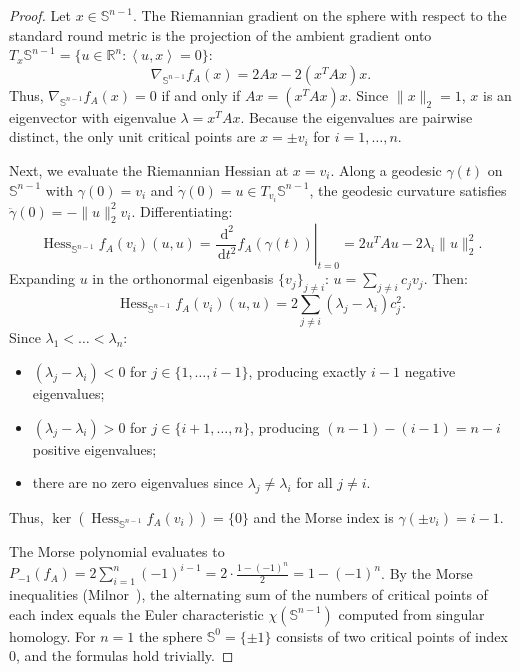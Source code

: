 \documentclass[11pt,a4paper,reqno]{amsart}
\theoremstyle{definition}
\numberwithin{equation}{section}
\newcommand{\R}{\mathbb{R}}
\newcommand{\Sph}{\mathbb{S}}
\newcommand{\inner}[2]{\left\langle #1, #2 \right\rangle}
\newcommand{\dif}{\,\mathrm{d}}
\begin{document}
\begin{proof}
Let $x \in \Sph^{n-1}$. The Riemannian gradient on the sphere with respect to the standard round metric is the projection of the ambient gradient onto $T_x \Sph^{n-1} = \{u \in \R^n \colon \inner{u}{x} = 0\}$:
\begin{equation}
    \nabla_{\Sph^{n-1}} f_A(x) = 2 A x - 2(x^T A x) x.
\end{equation}
Thus, $\nabla_{\Sph^{n-1}} f_A(x) = 0$ if and only if $Ax = (x^T Ax) x$. Since $\|x\|_2=1$, $x$ is an eigenvector with eigenvalue $\lambda = x^T Ax$. Because the eigenvalues are pairwise distinct, the only unit critical points are $x = \pm v_i$ for $i=1, \dots, n$.

Next, we evaluate the Riemannian Hessian at $x = v_i$. Along a geodesic $\gamma(t)$ on $\Sph^{n-1}$ with $\gamma(0) = v_i$ and $\dot{\gamma}(0) = u \in T_{v_i} \Sph^{n-1}$, the geodesic curvature satisfies $\ddot{\gamma}(0) = -\|u\|_2^2 v_i$. Differentiating:
\begin{equation}
    \operatorname{Hess}_{\Sph^{n-1}} f_A(v_i)(u, u) = \left.\frac{\dif^2}{\dif t^2} f_A(\gamma(t))\right|_{t=0} = 2 u^T A u - 2 \lambda_i \|u\|_2^2.
\end{equation}
Expanding $u$ in the orthonormal eigenbasis $\{v_j\}_{j \neq i}$: $u = \sum_{j \ne i} c_j v_j$. Then:
\begin{equation}
    \operatorname{Hess}_{\Sph^{n-1}} f_A(v_i)(u, u) = 2 \sum_{j \ne i} (\lambda_j - \lambda_i) c_j^2.
\end{equation}
Since $\lambda_1 < \dots < \lambda_n$:
\begin{itemize}
    \item $(\lambda_j - \lambda_i) < 0$ for $j \in \{1, \dots, i-1\}$, producing exactly $i-1$ negative eigenvalues;
    \item $(\lambda_j - \lambda_i) > 0$ for $j \in \{i+1, \dots, n\}$, producing $(n-1) - (i-1) = n - i$ positive eigenvalues;
    \item there are no zero eigenvalues since $\lambda_j \ne \lambda_i$ for all $j \ne i$.
\end{itemize}
Thus, $\ker(\operatorname{Hess}_{\Sph^{n-1}} f_A(v_i)) = \{0\}$ and the Morse index is $\gamma(\pm v_i) = i - 1$. 

The Morse polynomial evaluates to $P_{-1}(f_A) = 2 \sum_{i=1}^n (-1)^{i-1} = 2 \cdot \frac{1 - (-1)^n}{2} = 1 - (-1)^n$. By the Morse inequalities (Milnor~\cite{milnor1963morse}), the alternating sum of the numbers of critical points of each index equals the Euler characteristic $\chi(\Sph^{n-1})$ computed from singular homology. For $n = 1$ the sphere $\Sph^0 = \{\pm 1\}$ consists of two critical points of index $0$, and the formulas hold trivially.
\end{proof}
\end{document}
